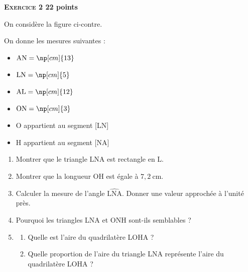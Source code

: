 \documentclass[11pt]{article}
\begin{document}
\newpage

\textbf{{\large \textsc{Exercice 2}} \hfill 22 points}

\medskip
\begin{minipage}{0.5\linewidth}
On considère la figure ci-contre.

On donne les mesures suivantes :

\begin{itemize}[label=$\bullet$]
\item $\mathrm{AN}= \np[cm]{13}$

\item $\mathrm{LN}= \np[cm]{5}$

\item $\mathrm{AL} = \np[cm]{12}$

\item $\mathrm{ON}= \np[cm]{3}$

\item O appartient au segment [LN]

\item $\mathrm{H}$ appartient au segment [NA]

\end{itemize}
\end{minipage}
\hfill
{}
\begin{enumerate}
\item Montrer que le triangle LNA est rectangle en L.
\item Montrer que la longueur $\mathrm{OH}$ est égale à $7,2 \mathrm{~cm}$.
\item Calculer la mesure de l'angle $\widehat{\mathrm{LNA}}$. Donner une valeur approchée à l'unité près.
\item Pourquoi les triangles LNA et ONH sont-ils semblables ?
\item 
	\begin{enumerate}
		\item Quelle est l'aire du quadrilatère LOHA ?
		\item Quelle proportion de l'aire du triangle LNA représente l'aire du quadrilatère LOHA ?
	\end{enumerate}
\end{enumerate}
\end{document}
